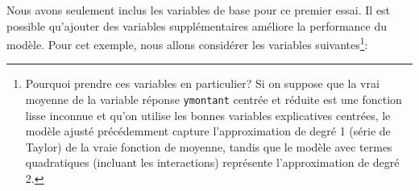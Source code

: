 \documentclass[
  11pt,
  letterpaper,
]{scrbook}
\newenvironment{Shaded}{\begin{snugshade}}{\end{snugshade}}
\newcommand{\AttributeTok}[1]{\textcolor[rgb]{0.40,0.45,0.13}{#1}}
\newcommand{\CommentTok}[1]{\textcolor[rgb]{0.37,0.37,0.37}{#1}}
\newcommand{\ConstantTok}[1]{\textcolor[rgb]{0.56,0.35,0.01}{#1}}
\newcommand{\DecValTok}[1]{\textcolor[rgb]{0.68,0.00,0.00}{#1}}
\newcommand{\FunctionTok}[1]{\textcolor[rgb]{0.28,0.35,0.67}{#1}}
\newcommand{\NormalTok}[1]{\textcolor[rgb]{0.00,0.23,0.31}{#1}}
\newcommand{\OtherTok}[1]{\textcolor[rgb]{0.00,0.23,0.31}{#1}}
\newcommand{\SpecialCharTok}[1]{\textcolor[rgb]{0.37,0.37,0.37}{#1}}
\newcommand{\StringTok}[1]{\textcolor[rgb]{0.13,0.47,0.30}{#1}}
\theoremstyle{definition}
\theoremstyle{remark}
\begin{document}
\begin{Shaded}
\end{Shaded}

Nous avons seulement inclus les variables de base pour ce premier essai.
Il est possible qu'ajouter des variables supplémentaires améliore la
performance du modèle. Pour cet exemple, nous allons considérer les
variables suivantes\footnote{Pourquoi prendre ces variables en
  particulier? Si on suppose que la vrai moyenne de la variable réponse
  \texttt{ymontant} centrée et réduite est une fonction lisse inconnue
  et qu'on utilise les bonnes variables explicatives centrées, le modèle
  ajusté précédemment capture l'approximation de degré 1 (série de
  Taylor) de la vraie fonction de moyenne, tandis que le modèle avec
  termes quadratiques (incluant les interactions) représente
  l'approximation de degré 2.}:
\end{document}
